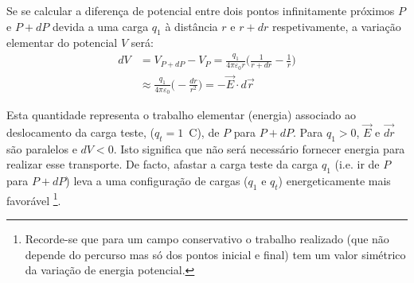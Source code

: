 \documentclass[a4paper,twoside,12pt]{article}      %
\begin{document}
Se se calcular a diferença de potencial entre dois pontos infinitamente próximos $P$ e $P+dP$ devida a uma carga $q_1$ à distância $r$ e $r+dr$ respetivamente, a variação elementar do potencial $V$ será:
\begin{align}
d V &= V_{P+dP} - V_P = \frac{q_1}{4 \pi \varepsilon_0 r} \big(  \frac{1}{r + dr} -\frac{1}{r} \big)\nonumber\\
	 &\approx \frac{q_1}{4 \pi \varepsilon_0 } \big(  - \frac{dr}{r^2} \big) = - \vec{E} \cdot d \vec{r}  \end{align}
%
%




 

Esta quantidade representa o trabalho elementar (energia) associado ao deslocamento da
carga teste, ($q_t=1\,$ C), de $P$ para $P+dP$. Para $q_1 > 0$,	$\vec{E}$ e $\vec{dr}$ são paralelos e $dV < 0$. Isto significa que
não será necessário fornecer energia para realizar esse transporte. 
De facto, afastar a carga teste da carga $q_1$ (i.e. ir de $P$ para $P+dP$) leva a uma configuração de cargas ($q_1$ e $q_t$) energeticamente mais favorável \footnote{Recorde-se que para um campo conservativo o trabalho realizado (que não depende do percurso mas só dos pontos inicial e final) tem um valor simétrico da variação de energia potencial.}.
\end{document}
